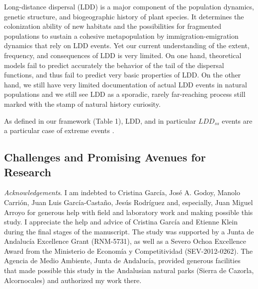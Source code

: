 \documentclass[a4paper, 12pt]{article}
\begin{document}
\begin{linenumbers}
Long-distance dispersal (LDD) is a major component of the population dynamics, genetic structure, and biogeographic history of plant species. It determines the colonization ability of new habitats and the possibilities for fragmented populations to sustain a cohesive metapopulation by immigration-emigration dynamics that rely on LDD events. Yet our current understanding of the extent, frequency, and consequences of LDD is very limited. On one hand, theoretical models fail to predict accurately the behavior of the tail of the dispersal functions, and thus fail to predict very basic properties of LDD. On the other hand, we still have very limited documentation of actual LDD events in natural populations and we still see LDD as a sporadic, rarely far-reaching process still marked with the stamp of natural history curiosity.

As defined in our framework (Table 1), LDD, and in particular $LDD_{ss}$ events are a particular case of extreme events \citep{Garcia:2017aa}. 



\subsection*{Challenges and Promising Avenues for Research}



\emph{Acknowledgements}. I am indebted to Cristina García, José A. Godoy, Manolo Carrión, Juan Luis García-Castaño, Jesús Rodríguez and, especially, Juan Miguel Arroyo for generous help with field and laboratory work and making possible this study. I appreciate the help and advice of Cristina García and Etienne Klein during the final stages of the manuscript. The study was supported by a Junta de Andalucía Excellence Grant (RNM-5731), as well as a Severo Ochoa Excellence Award from the Ministerio de Economía y Competitividad (SEV-2012-0262). The Agencia de Medio Ambiente, Junta de Andalucía, provided generous facilities that made possible this study in the Andalusian natural parks (Sierra de Cazorla, Alcornocales) and authorized my work there.

\end{linenumbers}

\newpage
\end{document}
